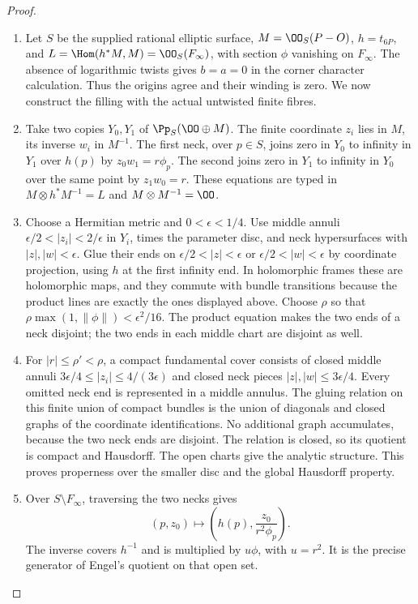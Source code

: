 \begin{proof}
\begin{enumerate}[label=\arabic*.,leftmargin=*]
\item Let $S$ be the supplied rational elliptic surface, $M=\OO_S(P-O)$, $h=t_{6P}$, and $L=\Hom(h^*M,M)=\OO_S(F_\infty)$, with section $\phi$ vanishing on $F_\infty$. The absence of logarithmic twists gives $b=a=0$ in the corner character calculation. Thus the origins agree and their winding is zero. We now construct the filling with the actual untwisted finite fibres.

\item Take two copies $Y_0,Y_1$ of $\Pp_S(\OO\oplus M)$. The finite coordinate $z_i$ lies in $M$, its inverse $w_i$ in $M^{-1}$. The first neck, over $p\in S$, joins zero in $Y_0$ to infinity in $Y_1$ over $h(p)$ by $z_0w_1=r\phi_p$. The second joins zero in $Y_1$ to infinity in $Y_0$ over the same point by $z_1w_0=r$. These equations are typed in $M\otimes h^*M^{-1}=L$ and $M\otimes M^{-1}=\OO$.

\item Choose a Hermitian metric and $0<\epsilon<1/4$. Use middle annuli $\epsilon/2<|z_i|<2/\epsilon$ in $Y_i$, times the parameter disc, and neck hypersurfaces with $|z|,|w|<\epsilon$. Glue their ends on $\epsilon/2<|z|<\epsilon$ or $\epsilon/2<|w|<\epsilon$ by coordinate projection, using $h$ at the first infinity end. In holomorphic frames these are holomorphic maps, and they commute with bundle transitions because the product lines are exactly the ones displayed above. Choose $\rho$ so that $\rho\max(1,\|\phi\|)<\epsilon^2/16$. The product equation makes the two ends of a neck disjoint; the two ends in each middle chart are disjoint as well.

\item For $|r|\le\rho'<\rho$, a compact fundamental cover consists of closed middle annuli $3\epsilon/4\le|z_i|\le4/(3\epsilon)$ and closed neck pieces $|z|,|w|\le3\epsilon/4$. Every omitted neck end is represented in a middle annulus. The gluing relation on this finite union of compact bundles is the union of diagonals and closed graphs of the coordinate identifications. No additional graph accumulates, because the two neck ends are disjoint. The relation is closed, so its quotient is compact and Hausdorff. The open charts give the analytic structure. This proves properness over the smaller disc and the global Hausdorff property.

\item Over $S\setminus F_\infty$, traversing the two necks gives
\[
 (p,z_0)\longmapsto\left(h(p),\frac{z_0}{r^2\phi_p}\right).
\]
The inverse covers $h^{-1}$ and is multiplied by $u\phi$, with $u=r^2$. It is the precise generator of Engel's quotient on that open set.


\end{enumerate}
\end{proof}
